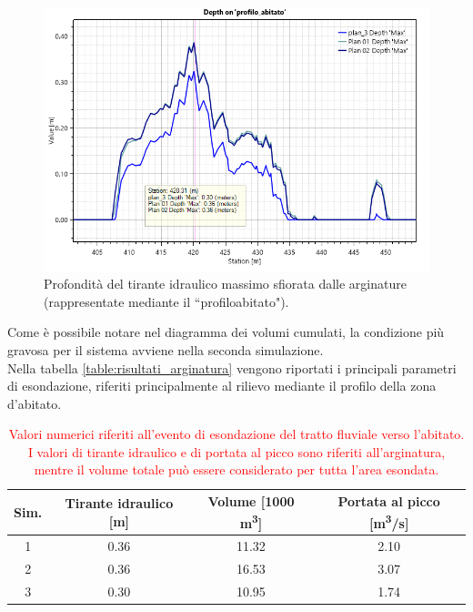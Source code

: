 \begin{figure}[htb] \centering
    \includegraphics[scale=0.5]{immagini/depth_profilo_abitato.png}
    \caption{Profondità del tirante idraulico massimo sfiorata dalle arginature (rappresentate mediante il ``profilo\textunderscore abitato").}
    \label{figure:depth_profilo_abitato}
\end{figure}

Come è possibile notare nel diagramma dei volumi cumulati, la condizione più gravosa per il sistema avviene nella seconda simulazione.\\
Nella tabella \eqref{table:risultati_arginatura} vengono riportati i principali parametri di esondazione, riferiti principalmente al rilievo mediante il profilo della zona d'abitato.
\begin{table}[hbt]\centering
    \caption{\textcolor{red}{Valori numerici riferiti all'evento di esondazione del tratto fluviale verso l'abitato. I valori di tirante idraulico e di portata al picco sono riferiti all'arginatura, mentre il volume totale può essere considerato per tutta l'area esondata.}}
    \begin{tabular}{cccc}
    \toprule
    Sim. & Tirante idraulico [m] & Volume [1000 \unit{m^3}] & Portata al picco [\unit{m^3/s}] \\
    \midrule
    1 & 0.36 & 11.32 &   2.10\\
    2 & 0.36 & 16.53 & 3.07  \\
    3 & 0.30 & 10.95 & 1.74  \\
    \bottomrule
    \end{tabular}
    \label{table:risultati_arginatura}
    \end{table}

